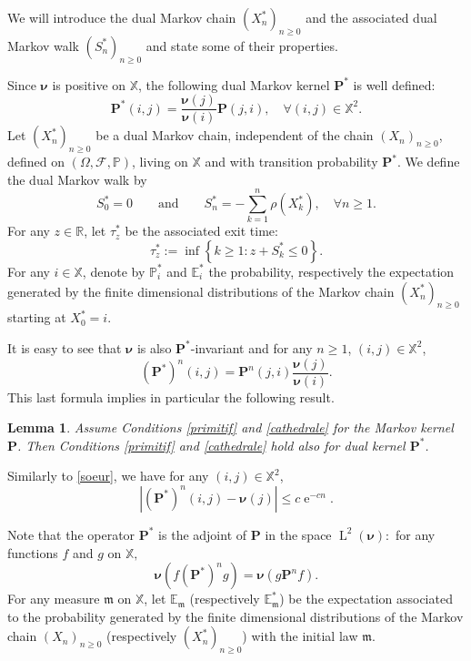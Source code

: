 \documentclass[12pt]{amsart}
\newtheorem{lemma}[theorem]{Lemma}
\theoremstyle{definition}
\numberwithin{equation}{section}
\newcommand*{\abs}[1]{\left\lvert#1\right\rvert}
\def\bb#1{\mathbb{#1}}
\def\bs#1{\boldsymbol{#1}}
\def\bf#1{\mathbf{#1}}
\def\scr#1{\mathscr{#1}}
\def\geq{\geqslant}
\def\leq{\leqslant}
\DeclareMathOperator{\LL}{L}
\DeclareMathOperator{\e}{e}
\begin{document}
We will introduce the dual Markov chain $(X_n^*)_{n\geq 0}$ and the associated dual Markov walk $(S_n^*)_{n\geq 0}$
and state some of their properties.

Since $\bs \nu$ is positive on $\bb X$, the following dual Markov kernel $\bf P^*$ is well defined:
\begin{equation}
\label{statueBP}
\bf P^* \left( i,j \right) = \frac{\bs \nu \left( j \right)}{\bs \nu (i)} \bf P \left( j,i \right), \quad \forall (i,j) \in \bb X^2.
\end{equation}
Let $\left( X_n^* \right)_{n\geq 0}$ be a dual Markov chain, independent of the chain $\left( X_n \right)_{n\geq 0}$, defined on $(\Omega, \scr F, \bb P)$, living on $\bb X$  and with transition probability $\bf P^*$. We define the dual Markov walk by
\begin{equation}
\label{promenade001}
S_0^* = 0 \qquad \text{and} \qquad S_n^* = -\sum_{k=1}^n \rho \left( X_k^* \right), \quad \forall n \geq 1.
\end{equation}
For any $z\in \bb R$, let $\tau_z^*$ be the associated exit time:
\begin{equation}
\label{promenade002}
\tau_z^* := \inf \left\{ k \geq 1 : z+S_k^* \leq 0 \right\}.
\end{equation}
For any $i\in \bb X$, denote by $\bb P_i^*$ and $\bb E_i^*$ the probability, respectively the expectation generated by the finite dimensional distributions of the Markov chain $( X_n^* )_{n\geq 0}$ starting at $X_0^* = i$.

It is easy to see that $\bs \nu$ is also $\bf P^*$-invariant and for any $n \geq 1$, $(i,j) \in \bb X^2$, 
\[
\left(\bf  P^* \right)^n (i,j) = \bf P^n (j,i) \frac{\bs \nu(j)}{\bs \nu(i)}.
\]
This last formula implies in particular the following result.

\begin{lemma}
\label{sourire}
Assume Conditions \ref{primitif} and \ref{cathedrale} for the Markov kernel $\bf P$. Then Conditions \ref{primitif} and \ref{cathedrale} hold also for dual kernel $\bf P^*$.
\end{lemma}

Similarly to \eqref{soeur}, we have for any $(i,j) \in \bb X^2$,
\begin{equation}
\label{vautour}
\abs{\left( \bf P^* \right)^n (i,j) - \bs \nu (j)} \leq  c\e^{-cn}.
\end{equation}

Note that the operator $\bf P^*$ is the adjoint of $\bf P$ in the space $\LL^2 \left( \bs \nu \right) :$ for any functions $f$ and $g$ on $\bb X,$
\[
\bs \nu \left( f \left(\bf P^*\right)^n g \right) = \bs \nu \left( g \bf P^n f \right).
\]
For any measure $\mathfrak{m}$ on $\bb X$, let $\bb E_{\mathfrak{m}}$ (respectively $\bb E_{\mathfrak{m}}^*$) be the expectation associated to the probability generated by the finite dimensional distributions of the Markov chain $\left( X_n \right)_{n\geq 0}$ (respectively $\left( X_n^* \right)_{n\geq 0}$) with the initial law $\mathfrak{m}$.
\end{document}
